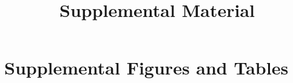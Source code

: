 \documentclass[11pt,a4paper]{article}
\title{\vspace*{-1cm}\textbf{Supplemental Material} \\\vspace{5mm}
}%
\author{}
\date{}
\begin{document}
\maketitle
\setcounter{secnumdepth}{1}
\setcounter{tocdepth}{1}
\renewcommand{\thesection}{\Alph{section}} 

\tableofcontents
\listoffigures
\listoftables

\newpage
\section{Supplemental Figures and Tables}
\end{document}
